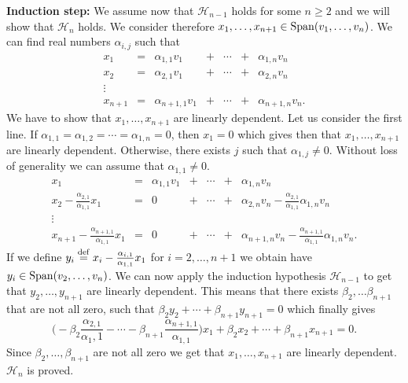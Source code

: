 \documentclass[11pt,nocut]{article}
\begin{document}
	\noindent\textbf{Induction step:} We assume now that $\mathcal{H}_{n-1}$ holds for some $n \geq 2$ and we will show that $\mathcal{H}_{n}$ holds. We consider therefore $x_1, \dots, x_{n+1} \in {{\rm Span}}(v_1, \dots, v_n)$. We can find real numbers $\alpha_{i,j}$ such that
	$$
	\begin{array}{ccccccc}
		x_1 &=& \alpha_{1,1} v_1 &+& \cdots &+& \alpha_{1,n} v_n\\
		x_2 &=& \alpha_{2,1} v_1 &+& \cdots &+& \alpha_{2,n} v_n \\
		\vdots &&&&&& \\
		x_{n+1} &=& \alpha_{n+1,1} v_1 &+& \cdots &+& \alpha_{n+1,n} v_n.
	\end{array}
	$$
	We have to show that $x_1, \dots, x_{n+1}$ are linearly dependent.
	Let us consider the first line. If $\alpha_{1,1} = \alpha_{1,2} = \cdots = \alpha_{1,n} = 0$, then $x_1 = 0$ which gives then that $x_1, \dots, x_{n+1}$ are linearly dependent.
	Otherwise, there exists $j$ such that $\alpha_{1,j} \neq 0$. Without loss of generality we can assume that $\alpha_{1,1} \neq 0$. 
	$$
	\begin{array}{ccccccc}
		x_1 &=& \alpha_{1,1} v_1 &+& \cdots &+& \alpha_{1,n} v_n\\
		x_2 - \frac{\alpha_{2,1}}{\alpha_{1,1}} x_1 &=& 0 &+& \cdots &+& \alpha_{2,n} v_n - \frac{\alpha_{2,1}}{\alpha_{1,1}} \alpha_{1,n}v_n \\
		\vdots &&&&&& \\
		x_{n+1} - \frac{\alpha_{n+1,1}}{\alpha_{1,1}} x_1&=& 0 &+& \cdots &+& \alpha_{n+1,n} v_n- \frac{\alpha_{n+1,1}}{\alpha_{1,1}} \alpha_{1,n}v_n.
	\end{array}
	$$
	If we define $y_i \overset{\rm def}{=} x_i - \frac{\alpha_{i,1}}{\alpha_{1,1}} x_1$ for $i = 2, \dots, n+1$ we obtain have $y_i \in {{\rm Span}}(v_2, \dots, v_{n})$. We can now apply the induction hypothesis $\mathcal{H}_{n-1}$ to get that $y_2, \dots, y_{n+1}$ are linearly dependent. This means that there exists $\beta_2, \dots \beta_{n+1}$ that are not all zero, such that $\beta_2 y_2 + \cdots + \beta_{n+1} y_{n+1} = 0$ which finally gives
	$$
	\Big(- \beta_2 \frac{\alpha_{2,1}}{\alpha_1,1} - \cdots - \beta_{n+1} \frac{\alpha_{n+1,1}}{\alpha_{1,1}}\Big) x_1 + \beta_2 x_2 + \cdots + \beta_{n+1} x_{n+1} = 0.
	$$
	Since $\beta_2, \dots, \beta_{n+1}$ are not all zero we get that $x_1, \dots, x_{n+1}$ are linearly dependent. $\mathcal{H}_{n}$ is proved.

	\vspace{1cm}
	\centerline{}

%
%
\end{document}
